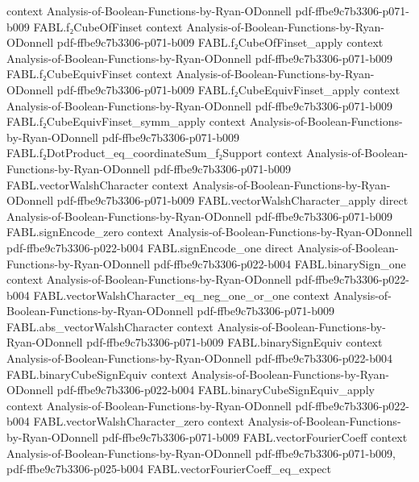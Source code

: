 \begin{theorem}
  {context}
  {Analysis-of-Boolean-Functions-by-Ryan-ODonnell}
  {pdf-ffbe9c7b3306-p071-b009}
\proofstep
  {FABL.f₂CubeOfFinset}
  {context}
  {Analysis-of-Boolean-Functions-by-Ryan-ODonnell}
  {pdf-ffbe9c7b3306-p071-b009}
\proofstep
  {FABL.f₂CubeOfFinset_apply}
  {context}
  {Analysis-of-Boolean-Functions-by-Ryan-ODonnell}
  {pdf-ffbe9c7b3306-p071-b009}
\proofstep
  {FABL.f₂CubeEquivFinset}
  {context}
  {Analysis-of-Boolean-Functions-by-Ryan-ODonnell}
  {pdf-ffbe9c7b3306-p071-b009}
\proofstep
  {FABL.f₂CubeEquivFinset_apply}
  {context}
  {Analysis-of-Boolean-Functions-by-Ryan-ODonnell}
  {pdf-ffbe9c7b3306-p071-b009}
\proofstep
  {FABL.f₂CubeEquivFinset_symm_apply}
  {context}
  {Analysis-of-Boolean-Functions-by-Ryan-ODonnell}
  {pdf-ffbe9c7b3306-p071-b009}
\proofstep
  {FABL.f₂DotProduct_eq_coordinateSum_f₂Support}
  {context}
  {Analysis-of-Boolean-Functions-by-Ryan-ODonnell}
  {pdf-ffbe9c7b3306-p071-b009}
\proofstep
  {FABL.vectorWalshCharacter}
  {context}
  {Analysis-of-Boolean-Functions-by-Ryan-ODonnell}
  {pdf-ffbe9c7b3306-p071-b009}
\proofstep
  {FABL.vectorWalshCharacter_apply}
  {direct}
  {Analysis-of-Boolean-Functions-by-Ryan-ODonnell}
  {pdf-ffbe9c7b3306-p071-b009}
\proofstep
  {FABL.signEncode_zero}
  {context}
  {Analysis-of-Boolean-Functions-by-Ryan-ODonnell}
  {pdf-ffbe9c7b3306-p022-b004}
\proofstep
  {FABL.signEncode_one}
  {direct}
  {Analysis-of-Boolean-Functions-by-Ryan-ODonnell}
  {pdf-ffbe9c7b3306-p022-b004}
\proofstep
  {FABL.binarySign_one}
  {context}
  {Analysis-of-Boolean-Functions-by-Ryan-ODonnell}
  {pdf-ffbe9c7b3306-p022-b004}
\proofstep
  {FABL.vectorWalshCharacter_eq_neg_one_or_one}
  {context}
  {Analysis-of-Boolean-Functions-by-Ryan-ODonnell}
  {pdf-ffbe9c7b3306-p071-b009}
\proofstep
  {FABL.abs_vectorWalshCharacter}
  {context}
  {Analysis-of-Boolean-Functions-by-Ryan-ODonnell}
  {pdf-ffbe9c7b3306-p071-b009}
\proofstep
  {FABL.binarySignEquiv}
  {context}
  {Analysis-of-Boolean-Functions-by-Ryan-ODonnell}
  {pdf-ffbe9c7b3306-p022-b004}
\proofstep
  {FABL.binaryCubeSignEquiv}
  {context}
  {Analysis-of-Boolean-Functions-by-Ryan-ODonnell}
  {pdf-ffbe9c7b3306-p022-b004}
\proofstep
  {FABL.binaryCubeSignEquiv_apply}
  {context}
  {Analysis-of-Boolean-Functions-by-Ryan-ODonnell}
  {pdf-ffbe9c7b3306-p022-b004}
\proofstep
  {FABL.vectorWalshCharacter_zero}
  {context}
  {Analysis-of-Boolean-Functions-by-Ryan-ODonnell}
  {pdf-ffbe9c7b3306-p071-b009}
\proofstep
  {FABL.vectorFourierCoeff}
  {context}
  {Analysis-of-Boolean-Functions-by-Ryan-ODonnell}
  {pdf-ffbe9c7b3306-p071-b009,
    pdf-ffbe9c7b3306-p025-b004}
\proofstep
  {FABL.vectorFourierCoeff_eq_expect}

\end{theorem}

